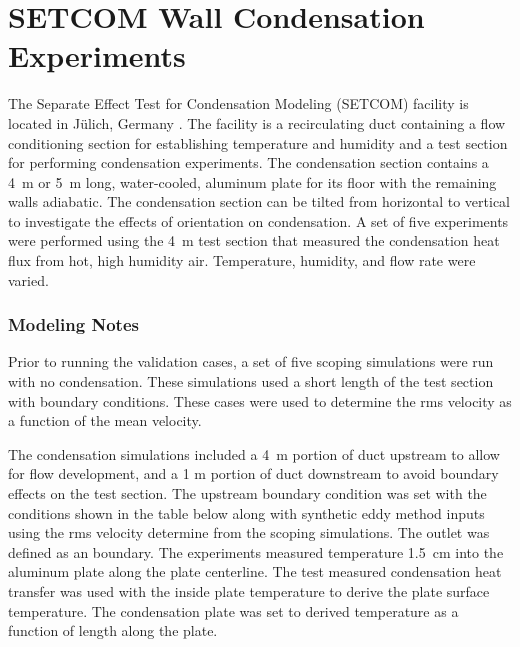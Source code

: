 \FloatBarrier

\section{SETCOM Wall Condensation Experiments}
\label{SETCOM_Cond_Description}

The Separate Effect Test for Condensation Modeling (SETCOM) facility is located in J\"{u}lich, Germany \cite{setcom_cfd}. The facility is a recirculating duct containing a flow conditioning section for establishing temperature and humidity and a test section for performing condensation experiments. The condensation section contains a 4~m or 5~m long, water-cooled, aluminum plate for its floor with the remaining walls adiabatic. The condensation section can be tilted from horizontal to vertical to investigate the effects of orientation on condensation. A set of five experiments were performed using the 4~m test section that measured the condensation heat flux from hot, high humidity air. Temperature, humidity, and flow rate were varied.

\subsubsection{Modeling Notes}

Prior to running the validation cases, a set of five scoping simulations were run with no condensation. These simulations used a short length of the test section with  boundary conditions. These cases were used to determine the rms velocity as a function of the mean velocity.

The condensation simulations included a 4~m portion of duct upstream to allow for flow development, and a 1 m portion of duct downstream to avoid boundary effects on the test section. The upstream boundary condition was set with the conditions shown in the table below along with synthetic eddy method inputs using the rms velocity determine from the scoping simulations. The outlet was defined as an  boundary. The experiments measured temperature 1.5~cm into the aluminum plate along the plate centerline. The test measured condensation heat transfer was used with the inside plate temperature to derive the plate surface temperature. The condensation plate  was set to derived temperature as a function of length along the plate.

